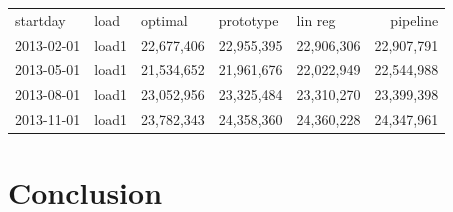 \documentclass{article}
\begin{document}
\begin{table}
	\begin{tabular}{lllllr}
		startday & load &optimal & prototype & lin reg & pipeline\\
		2013-02-01 & load1 & 22,677,406& 22,955,395 & 22,906,306 & 22,907,791\\
		2013-05-01 & load1 & 21,534,652& 21,961,676 & 22,022,949 & 22,544,988\\
		2013-08-01 & load1 & 23,052,956& 23,325,484 & 23,310,270 & 23,399,398\\
		2013-11-01 & load1 & 23,782,343& 24,358,360 & 24,360,228 & 24,347,961\\
	\end{tabular}
\end{table}
\section{Conclusion}
\end{document}
